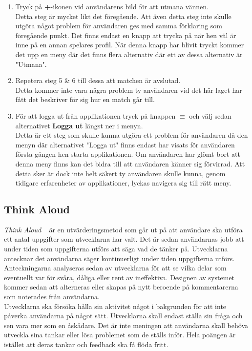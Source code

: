 \documentclass[a4paper, 11pt]{article}
\begin{document}
\begin{enumerate}
\item Tryck på \textbf{+}-ikonen vid användarens bild för att utmana vännen.\\
Detta steg är mycket likt det föregående. Att även detta steg inte skulle utgöra något problem för användaren ges med samma förklaring som föregående punkt. Det finns endast en knapp att trycka på när hen väl är inne på en annan spelares profil. När denna knapp har blivit tryckt kommer det upp en meny där det finns flera alternativ där ett av dessa alternativ är "Utmana".
\item Repetera steg 5 \& 6 till dessa att matchen är avslutad.\\
Detta kommer inte vara några problem ty användaren vid det här laget har fått det beskriver för sig hur en match går till.
\item För att logga ut från applikationen tryck på knappen \textbf{$\equiv$} och välj sedan alternativet \textbf{Logga ut} längst ner i menyn.\\
Detta är ett steg som skulle kunna utgöra ett problem för användaren då den menyn där alternativet "Logga ut" finns endast har visats för användaren första gången hen starta applikationen. Om användaren har glömt bort att denna meny finns kan det bidra till att användaren känner sig förvirrad. Att detta sker är dock inte helt säkert ty användaren skulle kunna, genom tidigare erfarenheter av applikationer, lyckas navigera sig till rätt meny.       
\end{enumerate}
 
\subsection{Think Aloud}
\textit{Think Aloud} ~\cite[sid 29--32]{thinkaloud} är en utvärderingsmetod som går ut på att användare ska utföra ett antal uppgifter som utvecklarna har valt. Det är sedan användarnas jobb att under tiden som uppgifterna utförs att säga vad de tänker på. Utvecklarna antecknar det användarna säger kontinuerligt under tiden uppgifterna utförs. Anteckningarna analyseras sedan av utvecklarna för att se vilka delar som eventuellt var för svåra, dåliga eller rent av ineffektiva. Designen av systemet kommer sedan att alterneras eller skapas på nytt beroende på kommentarerna som noterades från användarna.\\
Utvecklarna ska försöka hålla sin aktivitet något i bakgrunden för att inte påverka användarna på något sätt. Utvecklarna skall endast ställa sin fråga och sen vara mer som en åskådare. Det är inte meningen att användarna skall behöva utveckla sina tankar eller lösa problemet som de ställs inför. Hela poängen är istället att deras tankar och feedback ska få flöda fritt.
\end{document}

